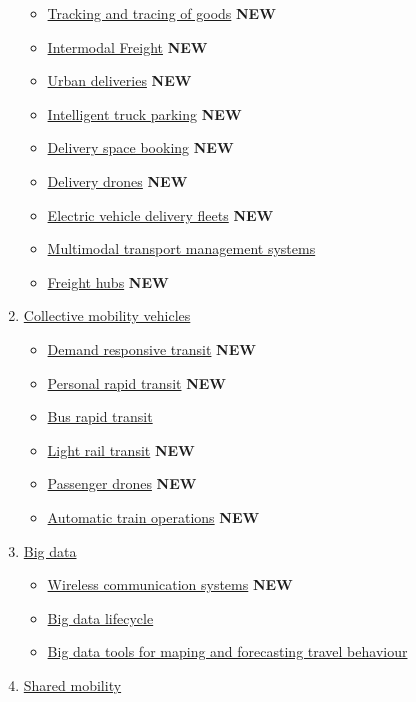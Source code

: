 \documentclass[
]{book}
\providecommand{\tightlist}{%
  \setlength{\itemsep}{0pt}\setlength{\parskip}{0pt}}
\begin{document}
\begin{enumerate}
  \begin{itemize}
  \tightlist
  \item
    \protect\hyperlink{dangerous_goods}{Tracking and tracing of goods} \textbf{NEW}
  \item
    \protect\hyperlink{intermodal_freight}{Intermodal Freight} \textbf{NEW}
  \item
    \protect\hyperlink{urban_delivery}{Urban deliveries} \textbf{NEW}
  \item
    \protect\hyperlink{intelligent_truck_park}{Intelligent truck parking} \textbf{NEW}
  \item
    \protect\hyperlink{space_book}{Delivery space booking} \textbf{NEW}
  \item
    \protect\hyperlink{delivery_drone}{Delivery drones} \textbf{NEW}
  \item
    \protect\hyperlink{electric_delivery_fleets}{Electric vehicle delivery fleets} \textbf{NEW}
  \item
    \protect\hyperlink{mtms}{Multimodal transport management systems}
  \item
    \protect\hyperlink{freight_hubs}{Freight hubs} \textbf{NEW}
  \end{itemize}
\item
  \protect\hyperlink{collective}{Collective mobility vehicles}

  \begin{itemize}
  \tightlist
  \item
    \protect\hyperlink{drt}{Demand responsive transit} \textbf{NEW}
  \item
    \protect\hyperlink{prt}{Personal rapid transit} \textbf{NEW}
  \item
    \protect\hyperlink{brt}{Bus rapid transit}
  \item
    \protect\hyperlink{lrt}{Light rail transit} \textbf{NEW}
  \item
    \protect\hyperlink{passenger_drones}{Passenger drones} \textbf{NEW}
  \item
    \protect\hyperlink{automatic_train}{Automatic train operations} \textbf{NEW}
  \end{itemize}
\item
  \protect\hyperlink{big}{Big data}

  \begin{itemize}
  \tightlist
  \item
    \protect\hyperlink{wireless_com}{Wireless communication systems} \textbf{NEW}
  \item
    \protect\hyperlink{bd_life}{Big data lifecycle}
  \item
    \protect\hyperlink{bd_tool_maping}{Big data tools for maping and forecasting travel behaviour}
  \end{itemize}
\item
  \protect\hyperlink{shared}{Shared mobility}


\end{enumerate}
\end{document}

